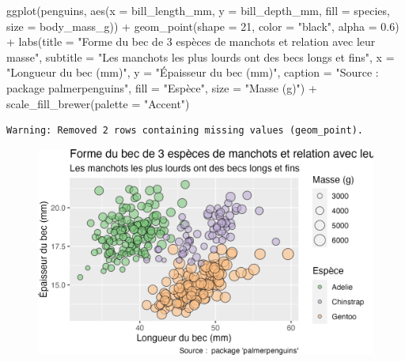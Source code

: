 \documentclass[
  letterpaper,
  DIV=11,
  numbers=noendperiod]{scrreprt}
\newenvironment{Shaded}{\begin{snugshade}}{\end{snugshade}}
\newcommand{\AttributeTok}[1]{\textcolor[rgb]{0.40,0.45,0.13}{#1}}
\newcommand{\DecValTok}[1]{\textcolor[rgb]{0.68,0.00,0.00}{#1}}
\newcommand{\FloatTok}[1]{\textcolor[rgb]{0.68,0.00,0.00}{#1}}
\newcommand{\FunctionTok}[1]{\textcolor[rgb]{0.28,0.35,0.67}{#1}}
\newcommand{\NormalTok}[1]{\textcolor[rgb]{0.00,0.23,0.31}{#1}}
\newcommand{\SpecialCharTok}[1]{\textcolor[rgb]{0.37,0.37,0.37}{#1}}
\newcommand{\StringTok}[1]{\textcolor[rgb]{0.13,0.47,0.30}{#1}}
\begin{document}
\begin{Shaded}
\begin{Highlighting}[]
\FunctionTok{ggplot}\NormalTok{(penguins, }\FunctionTok{aes}\NormalTok{(}\AttributeTok{x =}\NormalTok{ bill\_length\_mm, }\AttributeTok{y =}\NormalTok{ bill\_depth\_mm,}
                     \AttributeTok{fill =}\NormalTok{ species, }\AttributeTok{size =}\NormalTok{ body\_mass\_g)) }\SpecialCharTok{+}
  \FunctionTok{geom\_point}\NormalTok{(}\AttributeTok{shape =} \DecValTok{21}\NormalTok{, }\AttributeTok{color =} \StringTok{"black"}\NormalTok{, }\AttributeTok{alpha =} \FloatTok{0.6}\NormalTok{) }\SpecialCharTok{+}
  \FunctionTok{labs}\NormalTok{(}\AttributeTok{title =} \StringTok{"Forme du bec de 3 espèces de manchots et relation avec leur masse"}\NormalTok{,}
       \AttributeTok{subtitle =} \StringTok{"Les manchots les plus lourds ont des becs longs et fins"}\NormalTok{,}
       \AttributeTok{x =} \StringTok{"Longueur du bec (mm)"}\NormalTok{,}
       \AttributeTok{y =} \StringTok{"Épaisseur du bec (mm)"}\NormalTok{,}
       \AttributeTok{caption =} \StringTok{"Source :  package \textquotesingle{}palmerpenguins\textquotesingle{}"}\NormalTok{,}
       \AttributeTok{fill =} \StringTok{"Espèce"}\NormalTok{,}
       \AttributeTok{size =} \StringTok{"Masse (g)"}\NormalTok{) }\SpecialCharTok{+}
  \FunctionTok{scale\_fill\_brewer}\NormalTok{(}\AttributeTok{palette =} \StringTok{"Accent"}\NormalTok{)}
\end{Highlighting}
\end{Shaded}

\begin{verbatim}
Warning: Removed 2 rows containing missing values (geom_point).
\end{verbatim}

\begin{figure}[H]

{\centering \includegraphics{./03-visualization_files/figure-pdf/unnamed-chunk-100-1.png}

}

\end{figure}
\end{document}
